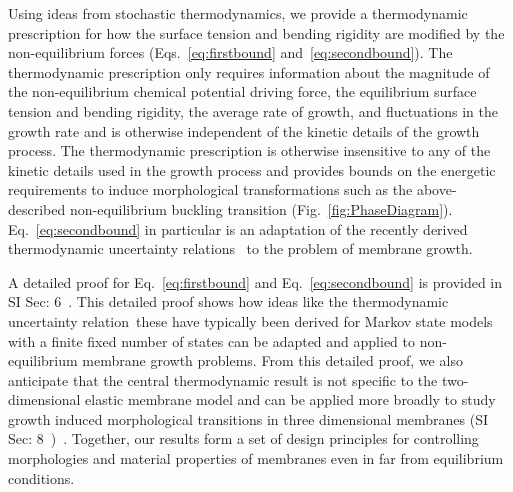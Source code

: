 \documentclass[amsmath,preprintnumbers,10pt,nofootinbib,prl,twocolumn]{revtex4-1}
\begin{document}
Using ideas from stochastic thermodynamics, we provide a thermodynamic prescription for how the surface tension and bending rigidity are modified by the non-equilibrium forces (Eqs.~\ref{eq:firstbound} and~\ref{eq:secondbound}). The thermodynamic prescription only requires information about the magnitude of the non-equilibrium chemical potential driving force, the equilibrium surface tension and bending rigidity, the average rate of growth, and fluctuations in the growth rate and is otherwise independent of the kinetic details of the growth process. The thermodynamic prescription is otherwise insensitive to any of the kinetic details used in the growth process and provides bounds on the energetic requirements to induce morphological transformations such as the above-described non-equilibrium buckling transition (Fig.~\ref{fig:PhaseDiagram}). 
Eq.~\ref{eq:secondbound} in particular is an adaptation of the recently derived thermodynamic uncertainty relations~\cite{Gingrich2016} to the problem of membrane growth.

A detailed proof for Eq.~\ref{eq:firstbound} and Eq.~\ref{eq:secondbound} is provided in SI Sec: 6~\cite{Supplementary}. This detailed proof shows how ideas like the thermodynamic uncertainty relation~\cite{Gingrich2016,Barato2015}\textendash these have typically been derived for Markov state models with a finite fixed number of states \textendash can be adapted and applied to non-equilibrium membrane growth problems. From this detailed proof, we also anticipate that the central thermodynamic result is not specific to the two-dimensional elastic membrane model and can be applied more broadly to study growth induced morphological transitions in three dimensional membranes (SI Sec: 8~\cite{Supplementary})~\cite{Mahadevan2019}. 
Together, our results form a set of design principles for controlling morphologies and material properties of membranes even in far from equilibrium conditions.

\end{document}
